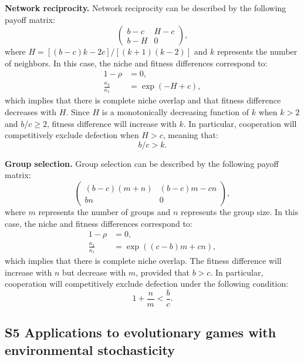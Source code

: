 \documentclass[12pt]{article}
\begin{document}
\textbf{Network reciprocity.} Network reciprocity can be described by the following payoff matrix:
\begin{equation}
\begin{pmatrix}
b-c & H-c \\
b-H & 0
\end{pmatrix},
\end{equation}
where $H= [(b-c)k -2c]/[(k+1)(k-2)]$ and $k$ represents the number of neighbors. 
In this case, the niche and fitness differences correspond to:
\begin{align}
1-\rho &= 0,\\
\frac{\kappa_2}{\kappa_1} &= \exp\left(-H+c\right),
\end{align}
which implies that there is complete niche overlap and that fitness difference decreases with $H$.
Since $H$ is a monotonically decreasing function of $k$ when $k > 2$ and $b/c \geq 2$, fitness difference will increase with $k$.
In particular, cooperation will competitively exclude defection when $H>c$, meaning that:
\begin{equation}
b/c > k.
\end{equation}

\textbf{Group selection.} Group selection can be described by the following payoff matrix:
\begin{equation}
\begin{pmatrix}
(b-c)(m+n) & (b-c)m - cn \\
bn & 0
\end{pmatrix},
\end{equation}
where $m$ represents the number of groups and $n$ represents the group size.
In this case, the niche and fitness differences correspond to:
\begin{align}
1-\rho &= 0,\\
\frac{\kappa_2}{\kappa_1} &= \exp\left((c-b)m+cn \right),
\end{align}
which implies that there is complete niche overlap.
The fitness difference will increase with $n$ but decrease with $m$, provided that $b > c$.
In particular, cooperation will competitively exclude defection under the following condition:
\begin{equation}
1+ \frac{n}{m} < \frac{b}{c}.
\end{equation}

\subsection*{S5 Applications to evolutionary games with environmental stochasticity}
\end{document}
